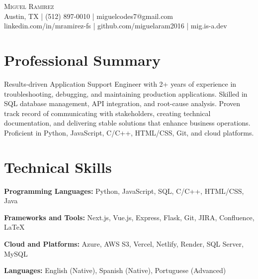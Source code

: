 \documentclass[letterpaper,10pt]{article}
\begin{document}
\begin{center}
  {\Large \scshape Miguel Ramirez} \\ \vspace{0pt}
  Austin, TX | (512) 897-0010 | miguelcodes7@gmail.com \\ 
  linkedin.com/in/mramirez-fs | github.com/miguelaram2016 | mig.is-a.dev
\end{center}

\section*{Professional Summary}
\begin{compactitem}
  \item[]
    Results-driven Application Support Engineer with 2+ years of experience in troubleshooting, debugging, and maintaining production applications. Skilled in SQL database management, API integration, and root-cause analysis. Proven track record of communicating with stakeholders, creating technical documentation, and delivering stable solutions that enhance business operations. Proficient in Python, JavaScript, C/C++, HTML/CSS, Git, and cloud platforms.
\end{compactitem}

\section*{Technical Skills}
\begin{compactitem}[leftmargin=0in]
  \item[]
    \textbf{Programming Languages:} Python, JavaScript, SQL, C/C++, HTML/CSS, Java
  \item[]
    \textbf{Frameworks and Tools:} Next.js, Vue.js, Express, Flask, Git, JIRA, Confluence, LaTeX
  \item[]
    \textbf{Cloud and Platforms:} Azure, AWS S3, Vercel, Netlify, Render, SQL Server, MySQL
  \item[]
    \textbf{Languages:} English (Native), Spanish (Native), Portuguese (Advanced)
\end{compactitem}

\end{document}
